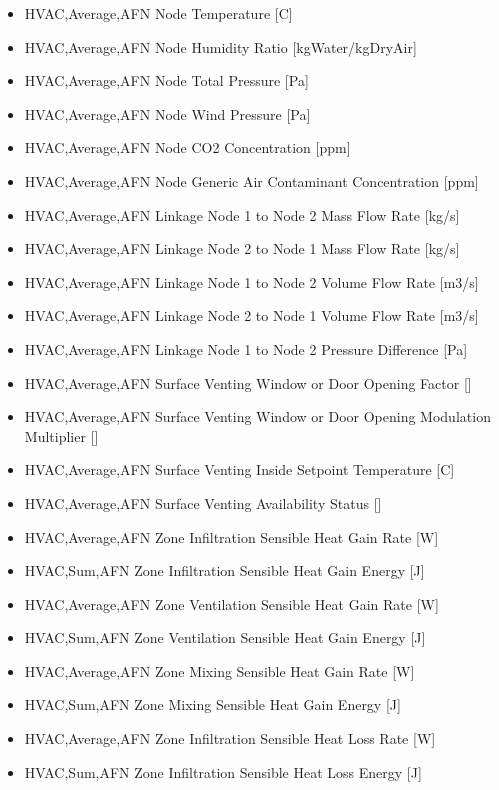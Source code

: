 \begin{itemize}
\item
  HVAC,Average,AFN Node Temperature {[}C{]}
\item
  HVAC,Average,AFN Node Humidity Ratio {[}kgWater/kgDryAir{]}
\item
  HVAC,Average,AFN Node Total Pressure {[}Pa{]}
\item
  HVAC,Average,AFN Node Wind Pressure {[}Pa{]}
\item
  HVAC,Average,AFN Node CO2 Concentration {[}ppm{]}
\item
  HVAC,Average,AFN Node Generic Air Contaminant Concentration {[}ppm{]}
\item
  HVAC,Average,AFN Linkage Node 1 to Node 2 Mass Flow Rate {[}kg/s{]}
\item
  HVAC,Average,AFN Linkage Node 2 to Node 1 Mass Flow Rate {[}kg/s{]}
\item
  HVAC,Average,AFN Linkage Node 1 to Node 2 Volume Flow Rate {[}m3/s{]}
\item
  HVAC,Average,AFN Linkage Node 2 to Node 1 Volume Flow Rate {[}m3/s{]}
\item
  HVAC,Average,AFN Linkage Node 1 to Node 2 Pressure Difference {[}Pa{]}
\item
  HVAC,Average,AFN Surface Venting Window or Door Opening Factor {[]}
\item
  HVAC,Average,AFN Surface Venting Window or Door Opening Modulation Multiplier {[]}
\item
  HVAC,Average,AFN Surface Venting Inside Setpoint Temperature {[}C{]}
\item
  HVAC,Average,AFN Surface Venting Availability Status {[]}
\item
  HVAC,Average,AFN Zone Infiltration Sensible Heat Gain Rate {[}W{]}
\item
  HVAC,Sum,AFN Zone Infiltration Sensible Heat Gain Energy {[}J{]}
\item
  HVAC,Average,AFN Zone Ventilation Sensible Heat Gain Rate {[}W{]}
\item
  HVAC,Sum,AFN Zone Ventilation Sensible Heat Gain Energy {[}J{]}
\item
  HVAC,Average,AFN Zone Mixing Sensible Heat Gain Rate {[}W{]}
\item
  HVAC,Sum,AFN Zone Mixing Sensible Heat Gain Energy {[}J{]}
\item
  HVAC,Average,AFN Zone Infiltration Sensible Heat Loss Rate {[}W{]}
\item
  HVAC,Sum,AFN Zone Infiltration Sensible Heat Loss Energy {[}J{]}

\end{itemize}
